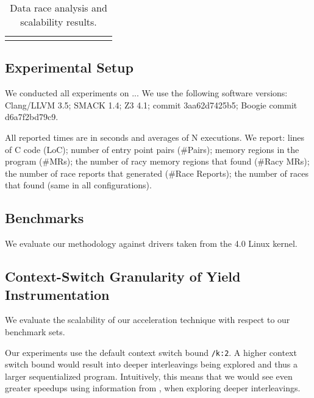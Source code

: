 \newcommand{\colspacing}{\hspace{1.8em}}
\begin{table*}[t]
\small
\centering
\begin{tabular}{l rrr rrr rr r r}
\centering

\end{tabular}
\caption{Data race analysis and scalability results.}
\label{tab:races}
\end{table*}

\subsection{Experimental Setup}
\label{eval:setup}

We conducted all experiments on ... We use the following software versions: Clang/LLVM 3.5; SMACK 1.4; Z3 4.1; \corral commit 3aa62d7425b5; Boogie commit d6a7f2bd79c9.

All reported times are in seconds and averages of N executions. We report: lines of C code (LoC); number of entry point pairs (\#Pairs); memory regions in the program (\#MRs); the number of racy memory regions that \whoop found (\#Racy MRs); the number of race reports that \whoop generated (\#Race Reports); the number of races that \corral found (same in all configurations).

\subsection{Benchmarks}
\label{eval:benchmarks}

We evaluate our methodology against \sizeOfBenchmarks drivers taken from the 4.0 Linux kernel. 

\subsection{Context-Switch Granularity of Yield Instrumentation}
\label{eval:granularity}

We evaluate the scalability of our acceleration technique with respect to our benchmark sets.

Our experiments use the default \corral context switch bound \texttt{/k:2}. A higher context switch bound would result into deeper interleavings being explored and thus a larger sequentialized program. Intuitively, this means that we would see even greater speedups using information from \whoop, when exploring deeper interleavings. 

